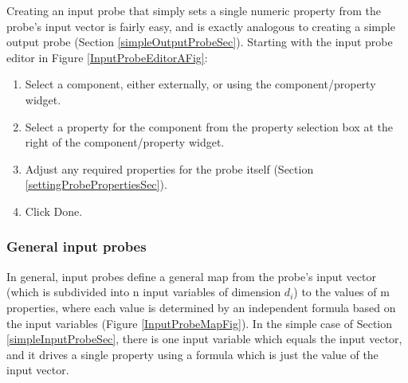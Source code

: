\documentclass{article}
\begin{document}
Creating an input probe that simply sets a single numeric
property from the probe's input vector is fairly easy, and
is exactly analogous to creating a simple output probe
(Section \ref{simpleOutputProbeSec}). Starting with
the input probe editor in Figure \ref{InputProbeEditorAFig}:

\begin{enumerate}

\item Select a component, either externally, or using the
component/property widget.

\item Select a property for the component from the property
selection box at the right of the component/property widget.

\item Adjust any required properties for the probe itself 
(Section \ref{settingProbePropertiesSec}).

\item Click {\sf Done}.

\end{enumerate}

\subsubsection{General input probes}

In general, input probes define a general map from the probe's
input vector (which is subdivided into n input variables
of dimension $d_i$) to the values of m properties, where each
value is determined by an independent formula based
on the input variables (Figure \ref{InputProbeMapFig}).
In the simple case of Section \ref{simpleInputProbeSec},
there is one input variable which equals the input vector,
and it drives a single property using a formula which is
just the value of the input vector.
\end{document}
